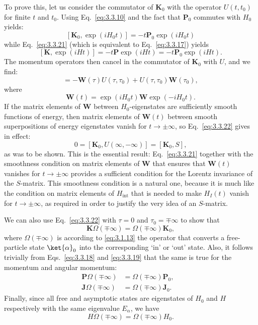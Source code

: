 To prove this, let us consider the commutator of $\mathbf{K}_0$ with the operator
$U(t,t_0)$ for finite $t$ and $t_0$. Using Eq.~\eqref{eq:3.3.10} and the fact that
$\mathbf{P}_0$ commutes with $H_0$ yields:
\[
[\mathbf{K}_0,\exp(iH_0t)]=-t\mathbf{P}_0\exp(iH_0t)
\]
while Eq.~\eqref{eq:3.3.21} (which is equivalent to Eq.~\eqref{eq:3.3.17}) yields
\[
[\mathbf{K},\exp(iHt)]=-t\mathbf{P}\exp(iHt)
=-t\mathbf{P}_0\exp(iHt).
\]
The momentum operators then cancel in the commutator of $\mathbf{K}_0$ with $U$,
and we find:
\begin{equation}
[\mathbf{K}_0,U(\tau,\tau_0)]
=-\mathbf{W}(\tau)U(\tau,\tau_0)+U(\tau,\tau_0)\mathbf{W}(\tau_0),
\tag{3.3.22}\label{eq:3.3.22}
\end{equation}
where
\begin{equation}
\mathbf{W}(t)=\exp(iH_0t)\mathbf{W}\exp(-iH_0t).
\tag{3.3.23}\label{eq:3.3.23}
\end{equation}
If the matrix elements of $\mathbf{W}$ between $H_0$-eigenstates are sufficiently
smooth functions of energy, then matrix elements of $\mathbf{W}(t)$ between smooth
superpositions of energy eigenstates vanish for $t\to\pm\infty$, so Eq.~\eqref{eq:3.3.22}
gives in effect:
\begin{equation}
0=[\mathbf{K}_0,U(\infty,-\infty)]=[\mathbf{K}_0,S],
\tag{3.3.24}\label{eq:3.3.24}
\end{equation}
as was to be shown. This is the essential result: Eq.~\eqref{eq:3.3.21} together with the
smoothness condition on matrix elements of $\mathbf{W}$ that ensures that
$\mathbf{W}(t)$ vanishes for $t\to\pm\infty$ provides a sufficient condition for
the Lorentz invariance of the $S$-matrix. This smoothness condition is a natural
one, because it is much like the condition on matrix elements of $H_{\mathrm{int}}$
that is needed to make $H_I(t)$ vanish for $t\to\pm\infty$, as required in order
to justify the very idea of an $S$-matrix.

We can also use Eq.~\eqref{eq:3.3.22} with $\tau=0$ and $\tau_0=\mp\infty$ to show that
\begin{equation}
\mathbf{K}\Omega(\mp\infty)=\Omega(\mp\infty)\mathbf{K}_0,
\tag{3.3.25}\label{eq:3.3.25}
\end{equation}
where $\Omega(\mp\infty)$ is according to \eqref{eq:3.1.13} the operator that converts a
free-particle state $\ket{\alpha}_0$ into the corresponding `in' or `out' state.
Also, it follows trivially from Eqs.~\eqref{eq:3.3.18} and \eqref{eq:3.3.19} that the same is true
for the momentum and angular momentum:
\begin{align}
\mathbf{P}\Omega(\mp\infty)&=\Omega(\mp\infty)\mathbf{P}_0,
&\tag{3.3.26}\label{eq:3.3.26}\\
\mathbf{J}\Omega(\mp\infty)&=\Omega(\mp\infty)\mathbf{J}_0.
&\tag{3.3.27}\label{eq:3.3.27}
\end{align}
Finally, since all free and asymptotic states are eigenstates of $H_0$ and $H$
respectively with the same eigenvalue $E_\alpha$, we have
\begin{equation}
H\Omega(\mp\infty)=\Omega(\mp\infty)H_0.
\tag{3.3.28}\label{eq:3.3.28}
\end{equation}

